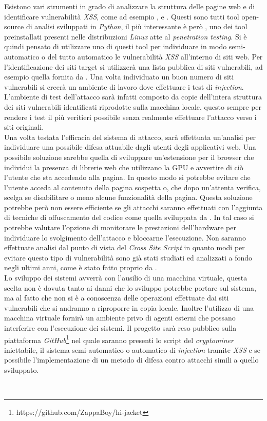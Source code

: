\documentclass[
11pt, %
oneside, %
italian, %
onehalfspacing,%
headsepline, %
]{MastersDoctoralThesis} %
\newcommand\citen[1]{\citeauthor{#1} \citep{#1}}
\newcommand\citetitlen[1]{\citetitle{#1} \citep{#1}}
\begin{document}
Esistono vari strumenti in grado di analizzare la struttura delle pagine web e di identificare vulnerabilità \emph{XSS}, come ad esempio \citetitlen{XSStrike}, \citetitlen{Traxss} e \citetitlen{XSSer}. Questi sono tutti tool open-source di analisi sviluppati in \emph{Python}, il più interessante è però , uno dei tool preinstallati presenti nelle distribuzioni \emph{Linux} atte al \emph{penetration testing}. Si è quindi pensato di utilizzare uno di questi tool per individuare in modo semi-automatico o del tutto automatico le vulnerabilità \emph{XSS} all'interno di siti web. Per l'identificazione dei siti target si utilizzerà una lista pubblica di siti vulnerabili, ad esempio quella fornita da \citen{xssed}. Una volta individuato un buon numero di siti vulnerabili si creerà un ambiente di lavoro dove effettuare i test di \emph{injection}. L'ambiente di test dell'attacco sarà infatti composto da copie dell'intera struttura dei siti vulnerabili identificati riprodotte sulla macchina locale, questo sempre per rendere i test il più veritieri possibile senza realmente effettuare l'attacco verso i siti originali.\\
Una volta testata l'efficacia del sistema di attacco, sarà effettuata un'analisi per individuare una possibile difesa attuabile dagli utenti degli applicativi web. Una possibile soluzione sarebbe quella di sviluppare un'estensione per il browser che individui la presenza di librerie web che utilizzano la GPU e avvertire di ciò l'utente che sta accedendo alla pagina. In questo modo si potrebbe evitare che l'utente acceda al contenuto della pagina sospetta o, che dopo un'attenta verifica, scelga se disabilitare o meno alcune funzionalità della pagina. Questa soluzione potrebbe però non essere efficiente se gli attacchi saranno effettuati con l'aggiunta di tecniche di offuscamento del codice come quella sviluppata da \citen{sharif2008impeding}. In tal caso si potrebbe valutare l'opzione di monitorare le prestazioni dell'hardware per individuare lo svolgimento dell'attacco e bloccarne l'esecuzione. Non saranno effettuate analisi dal punto di vista del \emph{Cross Site Script} in quanto modi per evitare questo tipo di vulnerabilità sono già stati studiati ed analizzati a fondo negli ultimi anni, come è stato fatto proprio da \citen{bisht2008xss}.\\
Lo sviluppo dei sistemi avverrà con l'ausilio di una macchina virtuale, questa scelta non è dovuta tanto ai danni che lo sviluppo potrebbe portare sul sistema, ma al fatto che non si è a conoscenza delle operazioni effettuate dai siti vulnerabili che si andranno a riproporre in copia locale. Inoltre l'utilizzo di una macchina virtuale fornirà un ambiente privo di agenti esterni che possano interferire con l'esecuzione dei sistemi. Il progetto sarà reso pubblico sulla piattaforma \emph{GitHub}\footnote{https://github.com/ZappaBoy/hi-jacket} nel quale saranno presenti lo script del \emph{cryptominer} iniettabile, il sistema semi-automatico o automatico di \emph{injection} tramite \emph{XSS} e se possibile l'implementazione di un metodo di difesa contro attacchi simili a quello sviluppato.


\printbibliography\
\end{document}
